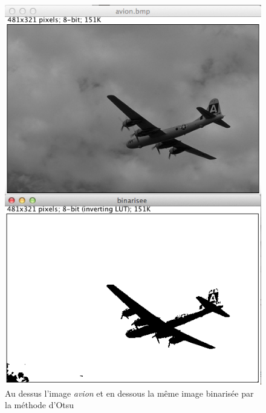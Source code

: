 \documentclass[a4paper,10pt]{article}
\begin{document}
\begin{figure}[ht]
\begin{center}
	\includegraphics[width=15cm]{images/avion}
\end{center}
	\caption{Au dessus l'image \emph{avion} et en dessous la m\^eme image binaris\'ee par la m\'ethode d'Otsu}
	\label{}
\end{figure}
\end{document}
